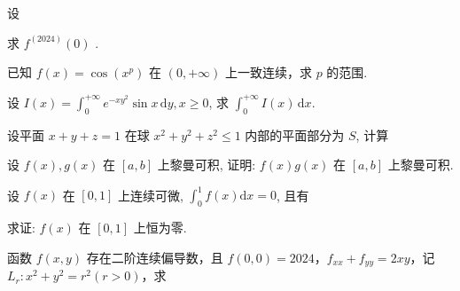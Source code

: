 \par{}
设\par
\nopagebreak[4]
求 $f^{(2024)}(0)$ .\par
已知 $f(x) = \cos (x^p)$ 在 $(0, +\infty)$ 上一致连续，求 $p$ 的范围.\par
设 $I(x) = \int_{0}^{+\infty} e^{-xy^2} \sin x \, \mathrm{d}y, x \geq 0$, 求 $\int_{0}^{+\infty} I(x) \, \mathrm{d}x$.\par
\par{}
设平面 $x + y + z = 1$ 在球 $x^{2} + y^{2} + z^{2} \leq 1$ 内部的平面部分为 $S$, 计算\par
\nopagebreak[4]
设 $f(x), g(x)$ 在 $[a, b]$ 上黎曼可积, 证明: $f(x)g(x)$ 在 $[a, b]$ 上黎曼可积.\par
\par{}
设 $f(x)$ 在 $[0,1]$ 上连续可微, $\int_0^1 f(x)\mathrm{d}x = 0$, 且有\par
\nopagebreak[4]
求证: $f(x)$ 在 $[0,1]$ 上恒为零.\par
\par{}
函数 $f(x, y)$ 存在二阶连续偏导数，且 $f(0, 0) = 2024$，$f_{xx} + f_{yy} = 2xy$，记 $L_r: x^2 + y^2 = r^2 (r > 0)$，求\par
